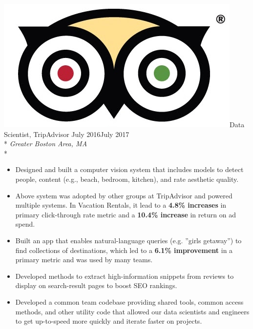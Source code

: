 \documentclass[print]{friggeri-cv} %
\newcommand{\tripicon}{\includegraphics[scale=0.05]{trip_logo.jpg}}%
\begin{document}
\begin{description} \itemsep1pt \parskip0pt 
  \item \tripicon {\largeheaderfont Data Scientist, TripAdvisor } \hfill
    {\smallheaderfont July 2016\textemdash July 2017}\\*
    {\footnotesize \emph{Greater Boston Area, MA}} \\*
    \begin{itemize} \itemsep1pt \parskip1pt 
      \item Designed and built a computer vision system that includes models to
      detect people, content (e.g., beach, bedroom, kitchen), and rate aesthetic
      quality.

      \item Above system was adopted by other groups at TripAdvisor and powered multiple
      systems. In Vacation Rentals, it lead to a \textbf{4.8\% increases} in primary
      click-through rate metric and a \textbf{10.4\% increase} in return on ad spend.

      \item Built an app that enables natural-language queries (e.g. ”girls getaway”)
      to find collections of destinations, which led to a \textbf{6.1\% improvement} in a
      primary metric and was used by many teams. 

      \item Developed methods to extract high-information snippets from reviews
      to display on search-result pages to boost SEO rankings.

      \item Developed a common team codebase providing shared tools, common
      access methods, and other utility code that allowed our data scientists
      and engineers to get up-to-speed more quickly and iterate faster on
      projects.  \end{itemize}
  \end{description}
\end{document}
